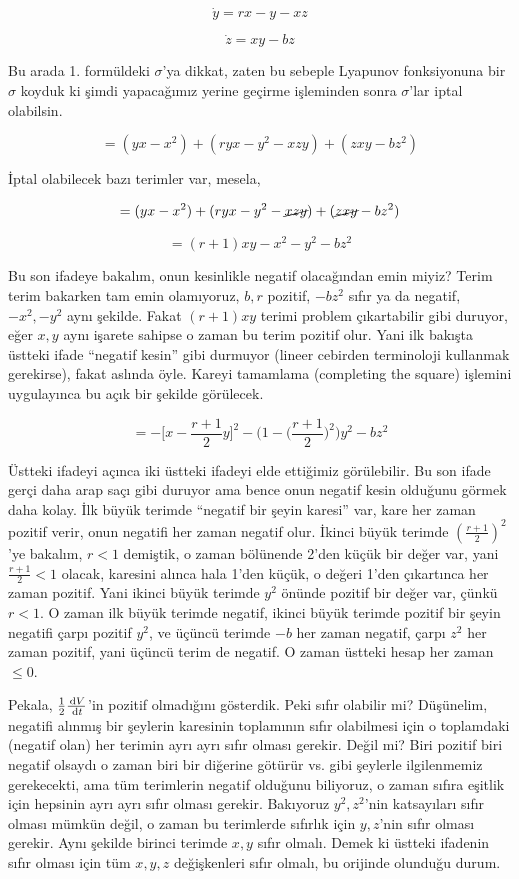 \documentclass[12pt,fleqn]{article}\usepackage{../../common}
\begin{document}
$$ \dot{y} = rx - y - xz $$

$$ \dot{z} = xy - bz $$

Bu arada 1. formüldeki $\sigma$'ya dikkat, zaten bu sebeple Lyapunov
fonksiyonuna bir $\sigma$ koyduk ki şimdi yapacağımız yerine geçirme
işleminden sonra $\sigma$'lar iptal olabilsin.

$$ = (yx - x^2) + (ryx - y^2 - xzy) + (zxy - bz^2)  $$

İptal olabilecek bazı terimler var, mesela, 

$$ = (yx - x^2) + (ryx - y^2 - \cancel{xzy}) + (\cancel{zxy} - bz^2)  $$

$$ = (r+1)xy -x^2 -y^2 - bz^2 $$

Bu son ifadeye bakalım, onun kesinlikle negatif olacağından emin miyiz?
Terim terim bakarken tam emin olamıyoruz, $b,r$ pozitif, $-bz^2$ sıfır ya
da negatif, $-x^2,-y^2$ aynı şekilde. Fakat $(r+1)xy$ terimi problem
çıkartabilir gibi duruyor, eğer $x,y$ aynı işarete sahipse o zaman bu terim
pozitif olur. Yani ilk bakışta üstteki ifade ``negatif kesin'' gibi
durmuyor (lineer cebirden terminoloji kullanmak gerekirse), fakat aslında
öyle. Kareyi tamamlama (completing the square) işlemini uygulayınca bu açık
bir şekilde görülecek.

$$ 
 = 
- \bigg[ x - \frac{r+1}{2}y \bigg]^2 
- \bigg( 1-\bigg(\frac{r+1}{2}\bigg)^2 \bigg)y^2 
- bz^2
$$

Üstteki ifadeyi açınca iki üstteki ifadeyi elde ettiğimiz görülebilir. Bu
son ifade gerçi daha arap saçı gibi duruyor ama bence onun negatif kesin
olduğunu görmek daha kolay. İlk büyük terimde ``negatif bir şeyin karesi''
var, kare her zaman pozitif verir, onun negatifi her zaman negatif
olur. İkinci büyük terimde $(\frac{r+1}{2})^2$'ye bakalım, $r < 1$
demiştik, o zaman bölünende 2'den küçük bir değer var, yani
$\frac{r+1}{2} < 1$ olacak, karesini alınca hala 1'den küçük, o değeri
1'den çıkartınca her zaman pozitif. Yani ikinci büyük terimde $y^2$ önünde
pozitif bir değer var, çünkü $r<1$. O zaman ilk büyük terimde negatif,
ikinci büyük terimde pozitif bir şeyin negatifi çarpı pozitif $y^2$, ve
üçüncü terimde $-b$ her zaman negatif, çarpı $z^2$ her zaman pozitif, yani
üçüncü terim de negatif. O zaman üstteki hesap her zaman $\le 0$.

Pekala, $\frac{1}{2} \frac{\,\mathrm{d} V}{\,\mathrm{d} t}$'in pozitif olmadığını
gösterdik. Peki sıfır olabilir mi? Düşünelim, negatifi alınmış bir şeylerin
karesinin toplamının sıfır olabilmesi için o toplamdaki (negatif olan) her
terimin ayrı ayrı sıfır olması gerekir. Değil mi? Biri pozitif biri negatif
olsaydı o zaman biri bir diğerine götürür vs. gibi şeylerle ilgilenmemiz
gerekecekti, ama tüm terimlerin negatif olduğunu biliyoruz, o zaman sıfıra
eşitlik için hepsinin ayrı ayrı sıfır olması gerekir. Bakıyoruz
$y^2,z^2$'nin katsayıları sıfır olması mümkün değil, o zaman bu terimlerde
sıfırlık için $y,z$'nin sıfır olması gerekir. Aynı şekilde birinci terimde
$x,y$ sıfır olmalı. Demek ki üstteki ifadenin sıfır olması için tüm $x,y,z$
değişkenleri sıfır olmalı, bu orijinde olunduğu durum.
\end{document}
